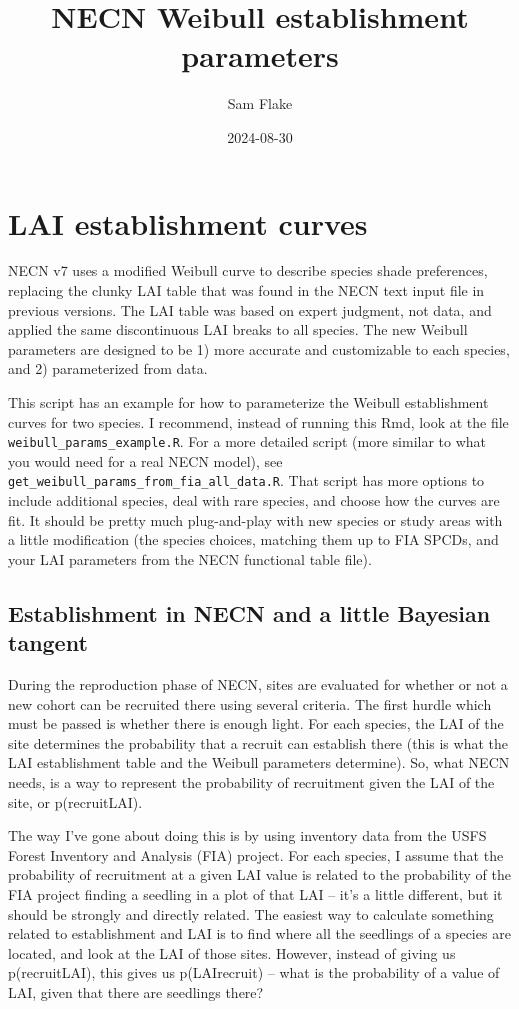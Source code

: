 \documentclass[
]{article}
\title{NECN Weibull establishment parameters}
\author{Sam Flake}
\date{2024-08-30}
\begin{document}
\maketitle

\section{LAI establishment curves}\label{lai-establishment-curves}

NECN v7 uses a modified Weibull curve to describe species shade
preferences, replacing the clunky LAI table that was found in the NECN
text input file in previous versions. The LAI table was based on expert
judgment, not data, and applied the same discontinuous LAI breaks to all
species. The new Weibull parameters are designed to be 1) more accurate
and customizable to each species, and 2) parameterized from data.

This script has an example for how to parameterize the Weibull
establishment curves for two species. I recommend, instead of running
this Rmd, look at the file \texttt{weibull\_params\_example.R}. For a
more detailed script (more similar to what you would need for a real
NECN model), see \texttt{get\_weibull\_params\_from\_fia\_all\_data.R}.
That script has more options to include additional species, deal with
rare species, and choose how the curves are fit. It should be pretty
much plug-and-play with new species or study areas with a little
modification (the species choices, matching them up to FIA SPCDs, and
your LAI parameters from the NECN functional table file).

\subsection{Establishment in NECN and a little Bayesian
tangent}\label{establishment-in-necn-and-a-little-bayesian-tangent}

During the reproduction phase of NECN, sites are evaluated for whether
or not a new cohort can be recruited there using several criteria. The
first hurdle which must be passed is whether there is enough light. For
each species, the LAI of the site determines the probability that a
recruit can establish there (this is what the LAI establishment table
and the Weibull parameters determine). So, what NECN needs, is a way to
represent the probability of recruitment given the LAI of the site, or
p(recruit\textbar LAI).

The way I've gone about doing this is by using inventory data from the
USFS Forest Inventory and Analysis (FIA) project. For each species, I
assume that the probability of recruitment at a given LAI value is
related to the probability of the FIA project finding a seedling in a
plot of that LAI -- it's a little different, but it should be strongly
and directly related. The easiest way to calculate something related to
establishment and LAI is to find where all the seedlings of a species
are located, and look at the LAI of those sites. However, instead of
giving us p(recruit\textbar LAI), this gives us p(LAI\textbar recruit)
-- what is the probability of a value of LAI, given that there are
seedlings there?
\end{document}
